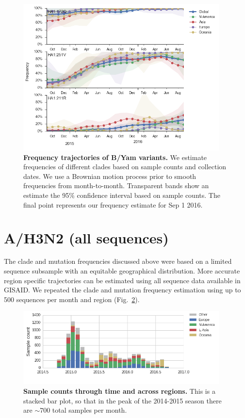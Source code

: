 \documentclass[11pt,oneside,letterpaper]{article}
\begin{document}
\begin{figure}[H]
	\centering
	\includegraphics[width=0.95\textwidth]{../figures/sep-2016/Yam_mutations.png}
	\caption{\textbf{Frequency trajectories of B/Yam variants.}
	We estimate frequencies of different clades based on sample counts and collection dates.
	We use a Brownian motion process prior to smooth frequencies from month-to-month.
	Transparent bands show an estimate the 95\% confidence interval based on sample counts.
	The final point represents our frequency estimate for Sep 1 2016.
	}
	\label{Yam_mutations}
\end{figure}

\clearpage
\pagebreak

\section*{A/H3N2 (all sequences)}

The clade and mutation frequencies discussed above were based on a limited sequence subsample with an equitable geographical distribution. More accurate region specific trajectories can be estimated using all sequence data available in GISAID. We repeated the clade and mutation frequency estimation using up to 500 sequences per month and region (Fig.\ \ref{H3N2_counts_all}).

\begin{figure}[H]
	\centering
	\includegraphics[width=0.95\textwidth]{../figures/sep-2016/H3N2_counts_all.png}
	\caption{\textbf{Sample counts through time and across regions.}
	This is a stacked bar plot, so that in the peak of the 2014-2015 season there are $\sim$700 total samples per month.
	}
	\label{H3N2_counts_all}
\end{figure}
\end{document}
